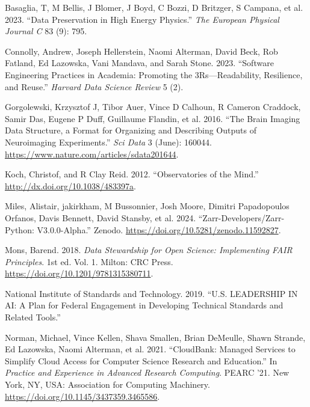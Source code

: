 \documentclass[
  letterpaper,
  DIV=11,
  numbers=noendperiod]{scrartcl}
\newlength{\cslhangindent}
\newenvironment{CSLReferences}[2] %
 {\begin{list}{}{%
  \setlength{\itemindent}{0pt}
  \setlength{\leftmargin}{0pt}
  \setlength{\parsep}{0pt}
  \ifodd #1
   \setlength{\leftmargin}{\cslhangindent}
   \setlength{\itemindent}{-1\cslhangindent}
  \fi
  \setlength{\itemsep}{#2\baselineskip}}}
 {\end{list}}
\begin{document}
\label{refs}
\begin{CSLReferences}{1}{0}
Basaglia, T, M Bellis, J Blomer, J Boyd, C Bozzi, D Britzger, S Campana,
et al. 2023. {``Data Preservation in High Energy Physics.''} \emph{The
European Physical Journal C} 83 (9): 795.

Connolly, Andrew, Joseph Hellerstein, Naomi Alterman, David Beck, Rob
Fatland, Ed Lazowska, Vani Mandava, and Sarah Stone. 2023. {``{Software}
{Engineering} {Practices} in {Academia}: Promoting the
3Rs---{Readability}, {Resilience}, and {Reuse}.''} \emph{Harvard Data
Science Review} 5 (2).

Gorgolewski, Krzysztof J, Tibor Auer, Vince D Calhoun, R Cameron
Craddock, Samir Das, Eugene P Duff, Guillaume Flandin, et al. 2016.
{``The {Brain} {Imaging} {Data} {Structure}, a Format for Organizing and
Describing Outputs of Neuroimaging Experiments.''} \emph{Sci Data} 3
(June): 160044. \url{https://www.nature.com/articles/sdata201644}.

Koch, Christof, and R Clay Reid. 2012. {``Observatories of the Mind.''}
\url{http://dx.doi.org/10.1038/483397a}.

Miles, Alistair, jakirkham, M Bussonnier, Josh Moore, Dimitri
Papadopoulos Orfanos, Davis Bennett, David Stansby, et al. 2024.
{``Zarr-Developers/Zarr-Python: V3.0.0-Alpha.''} Zenodo.
\url{https://doi.org/10.5281/zenodo.11592827}.

Mons, Barend. 2018. \emph{Data Stewardship for Open Science:
Implementing FAIR Principles}. 1st ed. Vol. 1. Milton: CRC Press.
\url{https://doi.org/10.1201/9781315380711}.

National Institute of Standards and Technology. 2019. {``{U.S}.
{LEADERSHIP} {IN} {AI}: A Plan for Federal Engagement in Developing
Technical Standards and Related Tools.''}

Norman, Michael, Vince Kellen, Shava Smallen, Brian DeMeulle, Shawn
Strande, Ed Lazowska, Naomi Alterman, et al. 2021. {``{CloudBank:
Managed Services to Simplify Cloud Access for Computer Science Research
and Education}.''} In \emph{Practice and Experience in Advanced Research
Computing}. PEARC '21. New York, NY, USA: Association for Computing
Machinery. \url{https://doi.org/10.1145/3437359.3465586}.


\end{CSLReferences}
\end{document}
